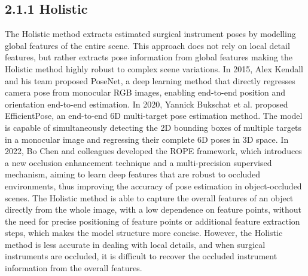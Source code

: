\documentclass[12pt]{article}
\begin{document}
\subsection{2.1.1 Holistic}
The Holistic method extracts estimated surgical instrument poses by modelling global features of the entire scene\cite{fan2024reinforcement}. This approach does not rely on local detail features, but rather extracts pose information from global features making the Holistic method highly robust to complex scene variations. In 2015, Alex Kendall and his team proposed PoseNet, a deep learning method that directly regresses camera pose from monocular RGB images, enabling end-to-end position and orientation end-to-end estimation\cite{kendall2015posenet}. In 2020, Yannick Bukschat et al. proposed EfficientPose, an end-to-end 6D multi-target pose estimation method. The model is capable of simultaneously detecting the 2D bounding boxes of multiple targets in a monocular image and regressing their complete 6D poses in 3D space\cite{bukschat2020efficientpose}. In 2022, Bo Chen and colleagues developed the ROPE framework, which introduces a new occlusion enhancement technique and a multi-precision supervised mechanism, aiming to learn deep features that are robust to occluded environments, thus improving the accuracy of pose estimation in object-occluded scenes\cite{chen2022occlusion}.
The Holistic method is able to capture the overall features of an object directly from the whole image, with a low dependence on feature points, without the need for precise positioning of feature points or additional feature extraction steps, which makes the model structure more concise\cite{chen2022occlusion}. However, the Holistic method is less accurate in dealing with local details, and when surgical instruments are occluded, it is difficult to recover the occluded instrument information from the overall features\cite{watson2014nature}.
\end{document}
